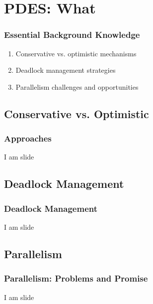 % 

\section{PDES: What}
%
\begin{frame}\frametitle{Essential Background Knowledge}
\begin{enumerate}
	\item Conservative vs. optimistic mechanisms
	\item Deadlock management strategies
	\item Parallelism challenges and opportunities
\end{enumerate}
\end{frame}

\subsection{Conservative vs. Optimistic}
\begin{frame}\frametitle{Approaches}
	I am slide
\end{frame}

\subsection{Deadlock Management}
\begin{frame}\frametitle{Deadlock Management}
	I am slide
\end{frame}

\subsection{Parallelism}
\begin{frame}\frametitle{Parallelism: Problems and Promise}
	I am slide
\end{frame}

\endinput  %
